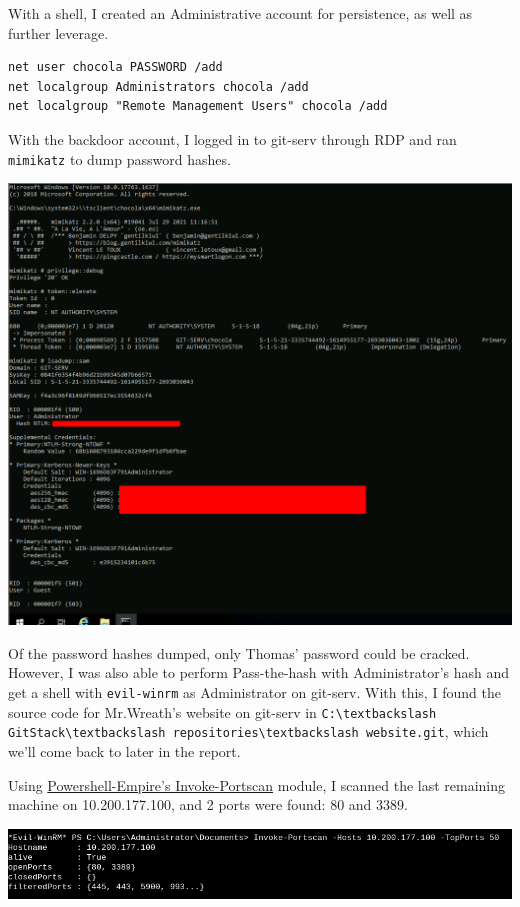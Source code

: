 With a shell, I created an Administrative account for persistence, as well as further leverage.

\begin{lstlisting}[basicstyle=\footnotesize]
net user chocola PASSWORD /add
net localgroup Administrators chocola /add
net localgroup "Remote Management Users" chocola /add
\end{lstlisting}

With the backdoor account, I logged in to git-serv through RDP and ran \lstinline{mimikatz} to dump password hashes.

\includegraphics[width=\textwidth]{img/mimikatz.png}

Of the password hashes dumped, only Thomas' password could be cracked. However, I was also able to perform Pass-the-hash with Administrator's hash and get a shell with \lstinline{evil-winrm} as Administrator on git-serv. With this, I found the source code for Mr.Wreath's website on git-serv in \lstinline{C:\textbackslash GitStack\textbackslash repositories\textbackslash website.git}, which we'll come back to later in the report.

Using \href{https://github.com/EmpireProject/Empire/blob/master/data/module_source/situational_awareness/network/Invoke-Portscan.ps1}{Powershell-Empire's Invoke-Portscan} module, I scanned the last remaining machine on 10.200.177.100, and 2 ports were found: 80 and 3389.

\includegraphics[width=\textwidth]{img/Invoke-Portscan.png}

